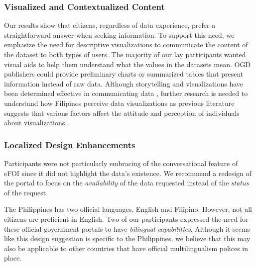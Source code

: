 \documentclass{sigchi}
\begin{document}
\subsubsection{Visualized and Contextualized Content}
Our results show that citizens, regardless of data experience, prefer a straightforward answer when seeking information. To support this need, we emphasize the need for descriptive visualizations to communicate the content of the dataset to both types of users. The majority of our lay participants wanted visual aids to help them understand what the values in the datasets mean. OGD publishers could provide preliminary charts or summarized tables that present information instead of raw data. Although storytelling and visualizations have been determined effective in communicating data \cite{Erete2016}, further research is needed to understand how Filipinos perceive data visualizations as previous literature suggests that various factors affect the attitude and perception of individuals about visualizations \cite{Peck2019}. 

\subsubsection{Localized Design Enhancements}
Participants were not particularly embracing of the conversational feature of eFOI since it did not highlight the data's existence. We recommend a redesign of the portal to focus on the \textit{availability} of the data requested instead of the \textit{status} of the request. 

The Philippines has two official languages, English and Filipino. However, not all citizens are proficient in English. Two of our participants expressed the need for these official government portals to have \textit{bilingual capabilities}. Although it seems like this design suggestion is specific to the Philippines, we believe that this may also be applicable to other countries that have official multilingualism polices in place.
\end{document}
